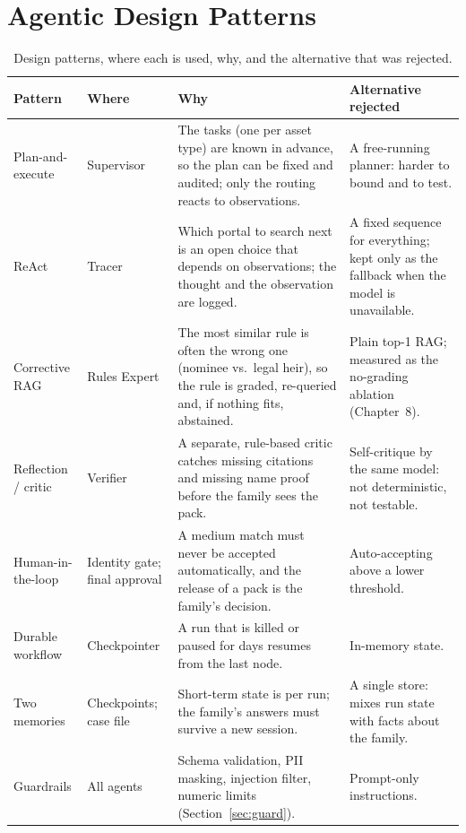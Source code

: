 \section{Agentic Design Patterns}
\begin{table}[H]
\centering\footnotesize{}
\caption[Design patterns]{Design patterns, where each is used, why, and the alternative that was rejected.}\label{tab:patterns}
\renewcommand{\arraystretch}{1.1}
\begin{tabularx}{\linewidth}{@{}p{2.3cm}p{2.3cm}XX@{}}
\toprule
\textbf{Pattern} & \textbf{Where} & \textbf{Why} & \textbf{Alternative rejected} \\ \midrule
Plan-and-execute & Supervisor & The tasks (one per asset type) are known in advance, so the plan can be fixed and audited; only the routing reacts to observations. & A free-running planner: harder to bound and to test. \\
ReAct & Tracer & Which portal to search next is an open choice that depends on observations; the thought and the observation are logged. & A fixed sequence for everything; kept only as the fallback when the model is unavailable. \\
Corrective RAG & Rules Expert & The most similar rule is often the wrong one (nominee vs.\ legal heir), so the rule is graded, re-queried and, if nothing fits, abstained. & Plain top-1 RAG; measured as the no-grading ablation (Chapter~8). \\
Reflection / critic & Verifier & A separate, rule-based critic catches missing citations and missing name proof before the family sees the pack. & Self-critique by the same model: not deterministic, not testable. \\
Human-in-the-loop & Identity gate; final approval & A medium match must never be accepted automatically, and the release of a pack is the family's decision. & Auto-accepting above a lower threshold. \\
Durable workflow & Checkpointer & A run that is killed or paused for days resumes from the last node. & In-memory state. \\
Two memories & Checkpoints; case file & Short-term state is per run; the family's answers must survive a new session. & A single store: mixes run state with facts about the family. \\
Guardrails & All agents & Schema validation, PII masking, injection filter, numeric limits (Section~\ref{sec:guard}). & Prompt-only instructions. \\ \bottomrule
\end{tabularx}
\end{table}


